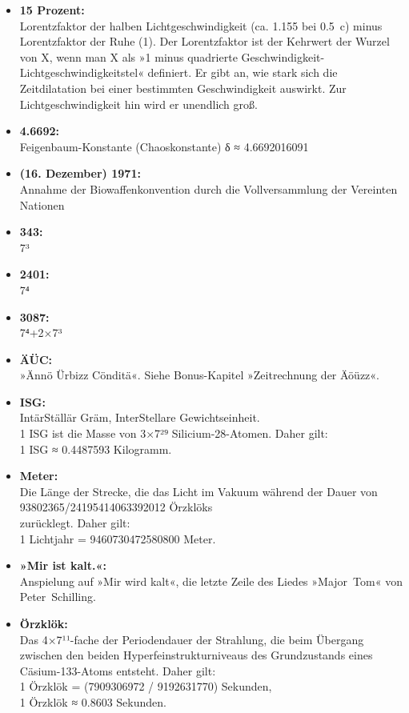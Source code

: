 \begin{itemize}
    \item \textbf{15 Prozent:}\\ Lorentzfaktor der halben Lichtgeschwindigkeit (ca. 1.155 bei 0.5~c) minus Lorentzfaktor der Ruhe (1). Der Lorentzfaktor ist der Kehrwert der Wurzel von X, wenn man X als »1 minus quadrierte Geschwindigkeit-Lichtgeschwindigkeitstel« definiert. Er gibt an, wie stark sich die Zeitdilatation bei einer bestimmten Geschwindigkeit auswirkt. Zur Lichtgeschwindigkeit hin wird er unendlich groß.
    \item \textbf{4.6692:}\\ Feigenbaum-Konstante (Chaoskonstante) δ ≈ 4.6692016091
    \item \textbf{(16. Dezember) 1971:}\\ Annahme der Biowaffenkonvention durch die Vollversammlung der Vereinten Nationen
    \item \textbf{343:}\\ 7³
    \item \textbf{2401:}\\ 7⁴
    \item \textbf{3087:}\\ 7⁴+2×7³
    \item \textbf{ÄÜC:}\\ »Ännö Ürbizz Cönditä«. Siehe Bonus-Kapitel »Zeitrechnung der Äöüzz«.
    \item \textbf{ISG:}\\ IntärStällär Gräm, InterStellare Gewichtseinheit.\\ 1 ISG ist die Masse von 3×7²⁹ Silicium-28-Atomen. Daher gilt:\\ 1 ISG ≈ 0.4487593 Kilogramm.
    \item \textbf{Meter:}\\ Die Länge der Strecke, die das Licht im Vakuum während der Dauer von\\ 93802365/24195414063392012 Örzklöks\\ zurücklegt. Daher gilt:\\ 1 Lichtjahr = 9460730472580800 Meter.
    \item \textbf{»Mir ist kalt.«:}\\ Anspielung auf »Mir wird kalt«, die letzte Zeile des Liedes »Major~Tom« von Peter~Schilling.
    \item \textbf{Örzklök:}\\ Das 4×7¹¹-fache der Periodendauer der Strahlung, die beim Übergang zwischen den beiden Hyperfeinstrukturniveaus des Grundzustands eines Cäsium-133-Atoms entsteht. Daher gilt:\\ 1 Örzklök = (7909306972 / 9192631770) Sekunden,\\1 Örzklök ≈ 0.8603 Sekunden.

\end{itemize}
